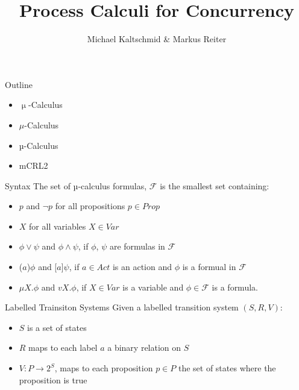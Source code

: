 \documentclass{beamer}
\title{Process Calculi for Concurrency}
\author{Michael Kaltschmid \& Markus Reiter}
\date{}
\begin{document}
  \maketitle

  \begin{frame}{Outline}
    \begin{itemize}
      \item $\upmu$-Calculus
      \item $\mu$-Calculus
      \item µ-Calculus
      \item mCRL2
    \end{itemize}
  \end{frame}

  \begin{frame}{Syntax}
    The set of µ-calculus formulas, $\mathcal{F}$ is the smallest set containing: \\[12pt]
    \begin{itemize}
      \item $p$ and $\neg p$ for all propositions $p \in Prop$ \\
      \item $X$ for all variables $X \in Var$ \\
      \item $\phi \lor \psi$ and $\phi \land \psi$, if $\phi$, $\psi$ are formulas in $\mathcal{F}$
      \item ($a$)$\phi$ and [$a$]$\psi$, if $a \in Act$ is an action and $\phi$ is a formual in  $\mathcal{F}$
      \item $\mu X. \phi$ and $v X. \phi$, if $X \in Var$ is a variable and $\phi \in \mathcal{F}$ is a formula.
    \end{itemize}
  \end{frame}

  \begin{frame}{Labelled Trainsiton Systems}
    Given a labelled transition system $(S, R, V)$: \\[12pt]
    \begin{itemize}
      \item $S$ is a set of states \\
      \item $R$ maps to each label $a$ a binary relation on $S$ \\
      \item $V:P\rightarrow 2^{S}$, maps to each proposition $p \in P$ the set of states where the proposition is true
    \end{itemize}
  \end{frame}
\end{document}
